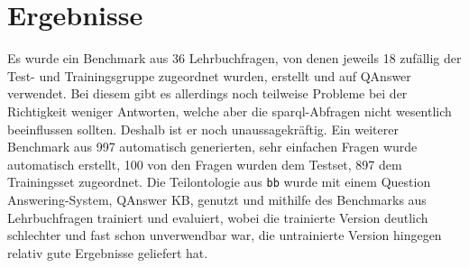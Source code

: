 \chapter{Ergebnisse}\label{ch:results}
Es wurde ein Benchmark aus 36 Lehrbuchfragen, von denen jeweils 18 zufällig der Test- und Trainingsgruppe zugeordnet wurden, erstellt und auf QAnswer verwendet.
Bei diesem gibt es allerdings noch teilweise Probleme bei der Richtigkeit weniger Antworten, welche aber die \ac{sparql}-Abfragen nicht wesentlich beeinflussen sollten.
Deshalb ist er noch unaussagekräftig.
Ein weiterer Benchmark aus 997 automatisch generierten, sehr einfachen Fragen wurde automatisch erstellt, 100 von den Fragen wurden dem Testset, 897 dem Trainingsset zugeordnet.
Die Teilontologie aus \texttt{bb} wurde mit einem Question Answering-System, QAnswer KB, genutzt und mithilfe des Benchmarks aus Lehrbuchfragen trainiert und evaluiert,
wobei die trainierte Version deutlich schlechter und fast schon unverwendbar war, die untrainierte Version hingegen relativ gute Ergebnisse geliefert hat.

